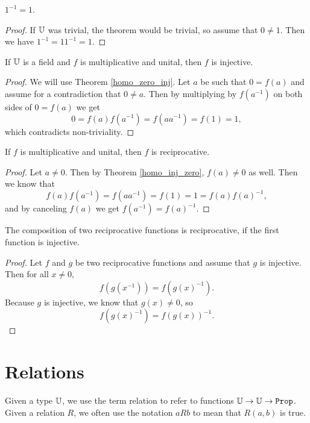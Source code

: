 \documentclass[../../math.tex]{subfiles}
\begin{document}
\begin{theorem}
    $1^{-1} = 1$.
\end{theorem}
\begin{proof}
    If $\mathbb{U}$ was trivial, the theorem would be trivial, so assume that $0 \neq
    1$.  Then we have $1^{-1} = 1 1^{-1} = 1$.
\end{proof}

\begin{instance}
    If $\mathbb{U}$ is a field and $f$ is multiplicative and unital, then $f$ is
    injective.
\end{instance}
\begin{proof}
    We will use Theorem \ref{homo_zero_inj}.  Let $a$ be such that $0 = f(a)$
    and assume for a contradiction that $0 \neq a$.  Then by multiplying by
    $f(a^{-1})$ on both sides of $0 = f(a)$ we get
    \[
        0 = f(a) f(a^{-1}) = f(a a^{-1}) = f(1) = 1,
    \]
    which contradicts non-triviality.
\end{proof}

\begin{instance}
    If $f$ is multiplicative and unital, then $f$ is reciprocative.
\end{instance}
\begin{proof}
    Let $a \neq 0$.  Then by Theorem \ref{homo_inj_zero}, $f(a) \neq 0$ as well.
    Then we know that \[
        f(a) f(a^{-1}) = f(a a^{-1}) = f(1) = 1 = f(a) f(a)^{-1},
    \]
    and by canceling $f(a)$ we get $f(a^{-1}) = f(a)^{-1}$.
\end{proof}

\begin{instance}
    The composition of two reciprocative functions is reciprocative, if the
    first function is injective.
\end{instance}
\begin{proof}
    Let $f$ and $g$ be two reciprocative functions and assume that $g$ is
    injective.  Then for all $x \neq 0$,
    \[
        f(g(x^{-1})) = f(g(x)^{-1}).
    \]
    Because $g$ is injective, we know that $g(x) \neq 0$, so
    \[
        f(g(x)^{-1}) = f(g(x))^{-1}.
    \]
\end{proof}

\section{Relations}

\begin{definition}
    Given a type $\mathbb{U}$, we use the term relation to refer to functions $\U
    \rightarrow \U \rightarrow \vtt{Prop}$.  Given a relation $R$, we often use
    the notation $aRb$ to mean that $R(a, b)$ is true.
\end{definition}
\end{document}
